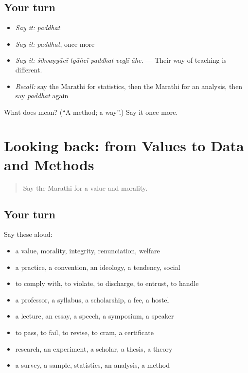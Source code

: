 \subsection*{Your turn}
\begin{itemize}
\raggedright
  \item \emph{Say it:} \emph{paddhat}
  \item \emph{Say it:} \emph{paddhat}, once more
  \item \emph{Say it:} \emph{śikvaṇyācī tyāñcī paddhat vegḷī āhe.} — Their way of teaching is different.
  \item \emph{Recall:} say the Marathi for statistics, then the Marathi for an analysis, then say \emph{paddhat} again
\end{itemize}

\begin{tcolorbox}[breakable,colback=teal!4,colframe=teal!35!black,title={Before you move on}]
What does  mean? (\textquotedblleft{}A method; a way\textquotedblright{}.) Say it once more.
\end{tcolorbox}
\section[(dialogue)]{Looking back: from Values to Data and Methods}

\label{lesson:MR-R373-review-366-373}



\begin{quote}
Say the Marathi for a value and morality.
\end{quote}

\subsection*{Your turn}
Say these aloud:

\begin{itemize}
\raggedright
  \item a value, morality, integrity, renunciation, welfare
  \item a practice, a convention, an ideology, a tendency, social
  \item to comply with, to violate, to discharge, to entrust, to handle
  \item a professor, a syllabus, a scholarship, a fee, a hostel
  \item a lecture, an essay, a speech, a symposium, a speaker
  \item to pass, to fail, to revise, to cram, a certificate
  \item research, an experiment, a scholar, a thesis, a theory
  \item a survey, a sample, statistics, an analysis, a method
\end{itemize}

